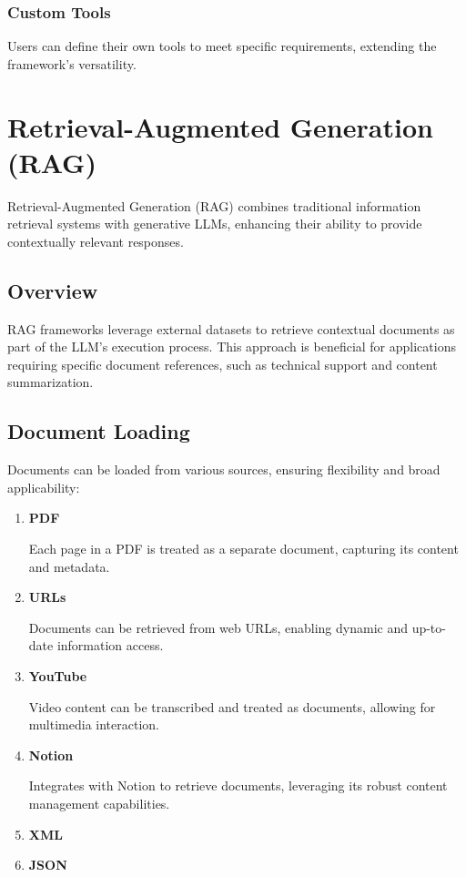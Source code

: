 \documentclass{article}
\begin{document}
\subsubsection{Custom Tools}
Users can define their own tools to meet specific requirements, extending the framework's versatility.

\section{Retrieval-Augmented Generation (RAG)}

Retrieval-Augmented Generation (RAG) combines traditional information retrieval systems with generative LLMs, enhancing their ability to provide contextually relevant responses.

\bigskip
\bigskip

\subsection{Overview}

RAG frameworks leverage external datasets to retrieve contextual documents as part of the LLM's execution process. This approach is beneficial for applications requiring specific document references, such as technical support and content summarization.

\bigskip
\bigskip

\subsection{Document Loading}

Documents can be loaded from various sources, ensuring flexibility and broad applicability:

\begin{enumerate}[label=\textbf{\arabic*.}, left=0pt, align=left, itemindent=*]
    \item \textbf{PDF}

    Each page in a PDF is treated as a separate document, capturing its content and metadata.

    \item \textbf{URLs}

    Documents can be retrieved from web URLs, enabling dynamic and up-to-date information access.

    \item \textbf{YouTube}

    Video content can be transcribed and treated as documents, allowing for multimedia interaction.

    \item \textbf{Notion}

    Integrates with Notion to retrieve documents, leveraging its robust content management capabilities.
    
    \item \textbf{XML}
    
    \item \textbf{JSON}
\end{enumerate}
\end{document}
